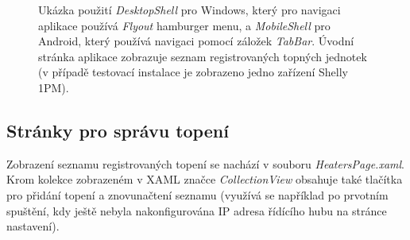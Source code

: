 \begin{figure}[hbt]
\centering
{}
\caption{Ukázka použití {\it DesktopShell} pro Windows, který pro navigaci aplikace používá {\it Flyout} hamburger menu, a {\it MobileShell} pro Android, který používá navigaci pomocí záložek {\it TabBar}. Úvodní stránka aplikace zobrazuje seznam registrovaných topných jednotek (v případě testovací instalace je zobrazeno jedno zařízení Shelly 1PM).}
\end{figure}

\subsection{Stránky pro správu topení}
Zobrazení seznamu registrovaných topení se nachází v souboru {\it HeatersPage.xaml}. Krom kolekce zobrazeném v XAML značce {\it CollectionView} obsahuje také tlačítka pro přidání topení a znovunačtení seznamu (využívá se například po prvotním spuštění, kdy ještě nebyla nakonfigurována IP adresa řídícího hubu na stránce nastavení).

